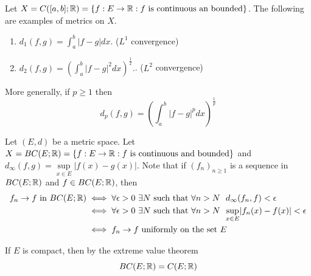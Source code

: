 \begin{example}
    Let $X = C([a,b]; \mathbb{R}) = \left\{f: E \to \mathbb{R} : \text{$f$ is continuous an bounded}\right\}$. The following are examples of metrics on $X$.
    \begin{enumerate}
        \item $d_1(f,g) = \int_a^b |f-g| dx$.   ($L^1$ convergence)
        \item $d_2(f,g) = \left(\int_a^b |f-g|^2 dx\right)^\frac{1}{2}.$.   ($L^2$ convergence)
    \end{enumerate}
    More generally, if $p \geq 1$ then
    \[d_p(f,g) = \left(\int_a^b |f-g|^p dx\right)^\frac{1}{p} \tag{$L^p$ convergence}\]
\end{example}

\begin{example}
    Let $(E,d)$ be a metric space. Let $X = BC(E; \mathbb{R}) = \left\{f: E \to \mathbb{R} : \text{$f$ is continuous and bounded}\right\}$ and $d_\infty (f,g) = \underset{x \in E}{\sup}|f(x) - g(x)|.$ Note that if $(f_n)_{n\geq 1}$ is a sequence in $BC(E; \mathbb{R})$ and $f \in BC(E; \mathbb{R})$, then 
    \begin{align*}
        \text{$f_n\to f$ in $BC(E; \mathbb{R})$} &\iff \forall \epsilon > 0 ~\exists N \text{ such that } \forall n > N ~~d_\infty(f_n,f) < \epsilon \\
        &\iff \forall \epsilon > 0 ~\exists N \text{ such that } \forall n > N ~~\underset{x \in E}{\sup}|f_n(x) - f(x)| < \epsilon \\
        &\iff f_n \to f \text{ uniformly on the set $E$}
    \end{align*}
\end{example}

\begin{note}
    If $E$ is compact, then by the extreme value theorem 
    $$BC(E; \mathbb{R}) = C(E ; \mathbb{R})$$
\end{note}

